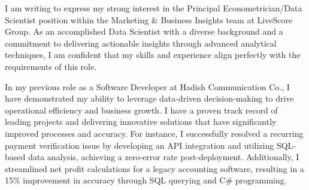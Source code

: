 \documentclass[../main.tex]{subfiles}
\begin{document}
\begin{cvletter}





\makelettertitle

\begin{cvletter}
I am writing to express my strong interest in the Principal Econometrician/Data Scientist position within the Marketing \& Business Insights team at LiveScore Group. As an accomplished Data Scientist with a diverse background and a commitment to delivering actionable insights through advanced analytical techniques, I am confident that my skills and experience align perfectly with the requirements of this role.

In my previous role as a Software Developer at Hadish Communication Co., I have demonstrated my ability to leverage data-driven decision-making to drive operational efficiency and business growth. I have a proven track record of leading projects and delivering innovative solutions that have significantly improved processes and accuracy. For instance, I successfully resolved a recurring payment verification issue by developing an API integration and utilizing SQL-based data analysis, achieving a zero-error rate post-deployment. Additionally, I streamlined net profit calculations for a legacy accounting software, resulting in a 15\% improvement in accuracy through SQL querying and C\# programming.


\end{cvletter}
\end{cvletter}
\end{document}
